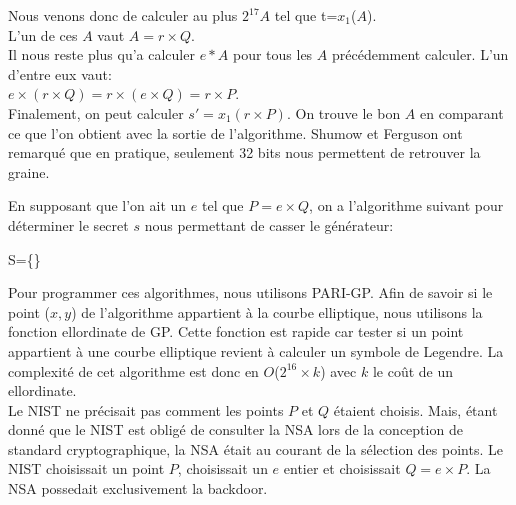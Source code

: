 \documentclass[a4paper,11pt]{report}
\begin{document}
	Nous venons donc de calculer au plus $2^{17} A$ tel que t=$x_1$($A$). \\
	L'un de ces $A$ vaut $A = r \times Q$. \\
	Il nous reste plus qu'a calculer $e*A$ pour tous les $A$ pr\'ec\'edemment calculer. L'un d'entre %
	eux vaut: \\
	$e\times (r\times Q)=r\times (e\times Q)=r\times P$.\\
	Finalement, on peut calculer $s'=x_1(r\times P)$. On trouve le bon $A$ en comparant ce que l'on %
	obtient avec la sortie de l'algorithme. Shumow et Ferguson ont remarqu\'e que en pratique, seulement 32 bits nous permettent de retrouver la graine.
	
	
	En supposant que l'on ait un $e$ tel que $P=e\times Q$, on a l'algorithme suivant pour d\'eterminer le secret $s$ nous permettant de casser le g\'en\'erateur:\\
	\begin{algorithm}[H]
		S=\{\}\;
		\caption{Algorithme permettant de casser le g\'en\'erateur donn\'e par le NIST}
		\end{algorithm}


		Pour programmer ces algorithmes, nous utilisons PARI-GP. Afin de savoir si le point ($x,y$) de l'algorithme appartient \`a la courbe elliptique, nous utilisons la fonction ellordinate de GP. Cette fonction est rapide car tester si un point appartient \`a une courbe elliptique revient %
		\`a calculer un symbole de Legendre. La complexit\'e de cet algorithme est donc en $O$($2^{16}\times k$) avec $k$ le co\^ut de un ellordinate.\\


		
		Le NIST ne pr\'ecisait pas comment les points $P$ et $Q$ \'etaient choisis. Mais, \'etant donn\'e %
		que le NIST est oblig\'e de consulter la NSA lors de la conception de standard cryptographique, la NSA \'etait au courant de la s\'election des points. Le NIST choisissait un point %
		$P$, choisissait un $e$ entier et choisissait $Q=e\times P$. La NSA possedait exclusivement la backdoor. 
	
\end{document}
